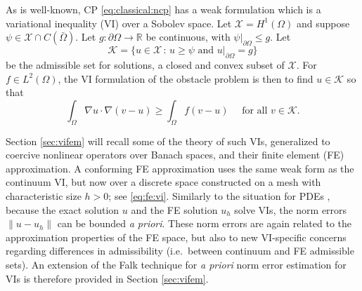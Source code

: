 \documentclass[]{interact}
\theoremstyle{plain}%
\theoremstyle{definition}
\theoremstyle{remark}
\newcommand{\RR}{\mathbb{R}}
\newcommand{\cK}{\mathcal{K}}
\newcommand{\cX}{\mathcal{X}}
\begin{document}
As is well-known, CP \eqref{eq:classical:ncp} has a weak formulation which is a variational inequality (VI) over a Sobolev space.  Let $\cX=H^1(\Omega)$ \cite{ElmanSilvesterWathen2014} and suppose $\psi \in \cX \cap C(\bar\Omega)$.  Let $g:\partial \Omega\to \RR$ be continuous, with $\psi|_{\partial \Omega} \le g$.  Let
\begin{equation} \label{eq:classical:admissible}
\cK = \{u \in \cX \,:\, u \ge \psi \text{ and } u|_{\partial \Omega} = g\}
\end{equation}
be the admissible set for solutions, a closed and convex subset of $\cX$.  For $f\in L^2(\Omega)$, the VI formulation of the obstacle problem \cite{KinderlehrerStampacchia1980} is then to find $u\in \cK$ so that
\begin{equation} \label{eq:classical:vi}
\int_\Omega \nabla u \cdot \nabla(v - u) \ge \int_\Omega f(v - u) \quad \text{ for all } v \in \cK.
\end{equation}

Section \ref{sec:vifem} will recall some of the theory of such VIs, generalized to coercive nonlinear operators over Banach spaces, and their finite element (FE) approximation.  A conforming FE approximation uses the same weak form as the continuum VI, but now over a discrete space constructed on a mesh with characteristic size $h>0$; see \eqref{eq:fe:vi}.  Similarly to the situation for PDEs \cite{ElmanSilvesterWathen2014}, because the exact solution $u$ and the FE solution $u_h$ solve VIs, the norm errors $\|u-u_h\|$ can be bounded \emph{a priori}.  These norm errors are again related to the approximation properties of the FE space, but also to new VI-specific concerns regarding differences in admissibility (i.e.~between continuum and FE admissible sets).  An extension of the Falk \cite{Falk1974} technique for \emph{a priori} norm error estimation for VIs is therefore provided in Section \ref{sec:vifem}.
\end{document}
